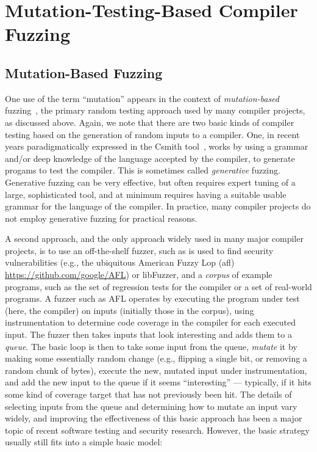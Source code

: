 \section{Mutation-Testing-Based Compiler Fuzzing}



\subsection{Mutation-Based Fuzzing}

One use of the term ``mutation'' appears in the context of \emph{mutation-based} fuzzing~\cite{ArtFuzz}, the primary random testing approach used by many compiler projects, as discussed above.  Again, we note that there are two basic kinds of compiler testing based on the generation of random inputs to a compiler.  One, in recent years paradigmatically expressed in the Csmith tool~\cite{csmith}, works by using a grammar and/or deep knowledge of the language accepted by the compiler, to generate progams to test the compiler.  This is sometimes called \emph{generative} fuzzing.  Generative fuzzing can be very effective, but often requires expert tuning of a large, sophisticated tool, and at minimum requires having a suitable usable grammar for the language of the compiler.  In practice, many compiler projects do not employ generative fuzzing for practical reasons.

A second approach, and the only approach widely used in many major compiler projects, is to use an off-the-shelf fuzzer, such as is used to find security vulnerabilities (e.g., the ubiquitous American Fuzzy Lop (afl) \url{https://github.com/google/AFL}) or libFuzzer, and a \emph{corpus} of example programs, such as the set of regression tests for the compiler or a set of real-world programs.  A fuzzer such as AFL operates by executing the program under test (here, the compiler) on inputs (initially those in the corpus), using instrumentation to determine code coverage in the compiler for each executed input.  The fuzzer then takes inputs that look interesting and adds them to a \emph{queue}.  The basic loop is then to take some input from the queue, \emph{mutate} it by making some essentially random change (e.g., flipping a single bit, or removing a random chunk of bytes), execute the new, mutated input under instrumentation, and add the new input to the queue if it seems ``interesting'' --- typically, if it hits some kind of coverage target that has not previously been hit.  The details of selecting inputs from the queue and determining how to mutate an input vary widely, and improving the effectiveness of this basic approach has been a major topic of recent software testing and security research.  However, the basic strategy usually still fits into a simple basic model:

